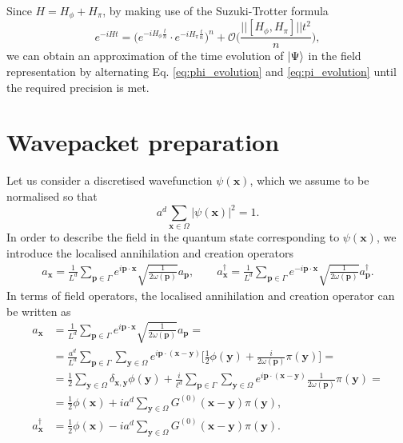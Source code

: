 \documentclass[a4paper,10pt]{report}
\begin{document}
Since $H=H_\phi+H_\pi$, by making use of the Suzuki-Trotter formula
\begin{equation}
e^{-iHt} = \bigg(e^{-iH_\phi\frac{t}{n}}\cdot e^{-iH_\pi\frac{t}{n}}\bigg)^n + \mathcal{O}\bigg(\frac{||[H_\phi,H_\pi]||t^2}{n}\bigg),
\end{equation}
we can obtain an approximation of the time evolution of $\ket{\Psi}$ in the field representation by alternating Eq. \eqref{eq:phi_evolution} and \eqref{eq:pi_evolution} until the required precision is met.

\section{Wavepacket preparation}
Let us consider a discretised wavefunction $\psi(\mathbf{x})$, which we assume to be normalised so that
\begin{equation}
a^d\sum_{\mathbf{x}\in\Omega}|\psi(\mathbf{x})|^2 = 1.
\end{equation}
In order to describe the field in the quantum state corresponding to $\psi(\mathbf{x})$, we introduce the localised annihilation and creation operators
\begin{align}
a_\mathbf{x} = \frac{1}{L^d}\sum_{\mathbf{p}\in\Gamma}e^{i\mathbf{p}\cdot\mathbf{x}}\sqrt{\frac{1}{2\omega(\mathbf{p})}}a_\mathbf{p}, \qquad a^\dag_\mathbf{x} = \frac{1}{L^d}\sum_{\mathbf{p}\in\Gamma}e^{-i\mathbf{p}\cdot\mathbf{x}}\sqrt{\frac{1}{2\omega(\mathbf{p})}}a^\dag_\mathbf{p}.
\end{align}
In terms of field operators, the localised annihilation and creation operator can be written as
\begin{align}
a_\mathbf{x} &= \frac{1}{L^d}\sum_{\mathbf{p}\in\Gamma}e^{i\mathbf{p}\cdot\mathbf{x}}\sqrt{\frac{1}{2\omega(\mathbf{p})}}a_\mathbf{p} = \nonumber\\
&=\frac{a^d}{L^d}\sum_{\mathbf{p}\in\Gamma}\sum_{\mathbf{y}\in\Omega}e^{i\mathbf{p}\cdot(\mathbf{x}-\mathbf{y})}\bigg[\frac{1}{2}\phi(\mathbf{y}) + \frac{i}{2\omega(\mathbf{p})}\pi(\mathbf{y})\bigg] = \nonumber\\
&=\frac{1}{2}\sum_{\mathbf{y}\in\Omega}\delta_{\mathbf{x},\mathbf{y}}\phi(\mathbf{y}) + \frac{i}{\ell^d}\sum_{\mathbf{p}\in\Gamma}\sum_{\mathbf{y}\in\Omega}e^{i\mathbf{p}\cdot(\mathbf{x}-\mathbf{y})}\frac{1}{2\omega(\mathbf{p})}\pi(\mathbf{y}) = \nonumber\\
&=\frac{1}{2}\phi(\mathbf{x}) + ia^d \sum_{\mathbf{y}\in\Omega}G^{(0)}(\mathbf{x}-\mathbf{y})\pi(\mathbf{y}), \\
a^\dag_\mathbf{x} &= \frac{1}{2}\phi(\mathbf{x}) - ia^d \sum_{\mathbf{y}\in\Omega}G^{(0)}(\mathbf{x}-\mathbf{y})\pi(\mathbf{y}).
\end{align}
\end{document}
